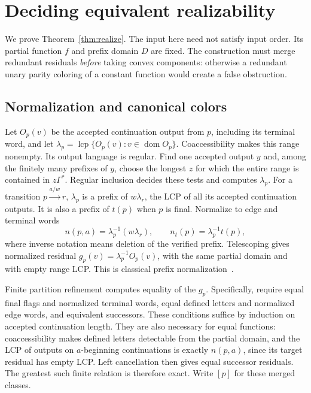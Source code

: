\documentclass[acmsmall,screen,nonacm,11pt]{acmart}
\newcommand{\lcp}{\operatorname{lcp}}
\newcommand{\dom}{\operatorname{dom}}
\theoremstyle{definition}
\begin{document}
\section{Deciding equivalent realizability}\label{sec:realize}

We prove Theorem~\ref{thm:realize}. The input here need not satisfy input
order. Its partial function $f$ and prefix domain $D$ are fixed. The
construction must merge redundant residuals \emph{before} taking convex
components: otherwise a redundant unary parity coloring of a constant
function would create a false obstruction.

\subsection{Normalization and canonical colors}

Let $O_p(v)$ be the accepted continuation output from $p$, including its
terminal word, and let
$\lambda_p=\lcp\{O_p(v):v\in\dom O_p\}$.
Coaccessibility makes this range nonempty. Its output language is regular.
Find one accepted output $y$ and, among the finitely many prefixes of $y$,
choose the longest $z$ for which the entire range is contained in
$z\Gamma^*$. Regular inclusion decides these tests and computes $\lambda_p$.
For a transition $p\xrightarrow{a/w}r$, $\lambda_p$ is a prefix of
$w\lambda_r$, the LCP of all its accepted continuation outputs. It is
also a prefix of $t(p)$ when $p$ is final. Normalize to edge and terminal
words
\begin{equation}\label{eq:normalize}
 n(p,a)=\lambda_p^{-1}(w\lambda_r),\qquad
 n_t(p)=\lambda_p^{-1}t(p),
\end{equation}
where inverse notation means deletion of the verified prefix. Telescoping
gives normalized residual $g_p(v)=\lambda_p^{-1}O_p(v)$, with the same
partial domain and with empty range LCP. This is classical prefix
normalization~\cite{BC00}.

Finite partition refinement computes equality of the $g_p$. Specifically,
require equal final flags and normalized terminal words, equal defined
letters and normalized edge words, and equivalent successors. These
conditions suffice by induction on accepted continuation length. They are
also necessary for equal functions: coaccessibility makes defined letters
detectable from the partial domain, and the LCP of outputs on $a$-beginning
continuations is exactly $n(p,a)$, since its target residual has empty LCP.
Left cancellation then gives equal successor residuals. The greatest such
finite relation is therefore exact. Write $[p]$ for these merged classes.
\end{document}
